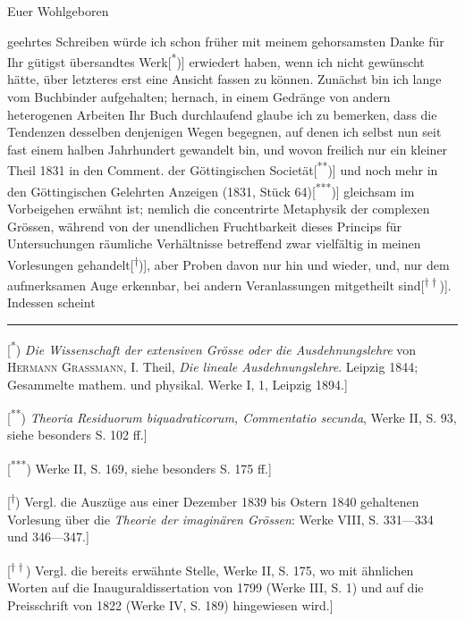 \par\medskip\noindent\hspace*{.26\linewidth}Euer Wohlgeboren
\par\indent geehrtes Schreiben würde ich schon früher mit meinem gehorsamsten Danke für Ihr gütigst übersandtes Werk[\textsuperscript{*})] erwiedert haben, wenn ich nicht gewünscht hätte, über letzteres erst eine Ansicht fassen zu können. Zunächst bin ich lange vom Buchbinder aufgehalten; hernach, in einem Gedränge von andern heterogenen Arbeiten Ihr Buch durchlaufend glaube ich zu bemerken, dass die Tendenzen desselben  denjenigen Wegen begegnen, auf denen ich selbst nun seit fast einem halben Jahrhundert gewandelt bin, und wovon freilich nur ein kleiner Theil 1831 in den Comment. der Göttingischen Societät[\textsuperscript{**})] und noch mehr in den Göttingischen Gelehrten Anzeigen (1831, Stück 64)[\textsuperscript{***})] gleichsam im Vorbeigehen erwähnt ist; nemlich die concentrirte Metaphysik der complexen Grössen, während von der unendlichen Fruchtbarkeit dieses Princips für Untersuchungen räumliche Verhältnisse betreffend zwar vielfältig in meinen Vorlesungen gehandelt[\textsuperscript{\ensuremath{\dagger}})], aber Proben davon nur hin und wieder, und,  nur dem aufmerksamen Auge erkennbar, bei andern Veranlassungen mitgetheilt sind[\textsuperscript{\ensuremath{\dagger\dagger}})]. Indessen scheint
\par\medskip\noindent\rule{.24\linewidth}{.4pt}\par\smallskip
{\small
\noindent\hspace*{\parindent}[\textsuperscript{*}) \textit{Die Wissenschaft der extensiven Grösse oder die Ausdehnungslehre} von \textsc{Hermann Grassmann}, I. Theil, \textit{Die lineale Ausdehnungslehre}. Leipzig 1844; Gesammelte mathem. und physikal. Werke I, 1, Leipzig 1894.]
\par\noindent\hspace*{\parindent}[\textsuperscript{**}) \textit{Theoria Residuorum biquadraticorum, Commentatio secunda}, Werke II, S. 93, siehe besonders S. 102 ff.]
\par\noindent\hspace*{\parindent}[\textsuperscript{***}) Werke II, S. 169, siehe besonders S. 175 ff.]
\par\noindent\hspace*{\parindent}[\textsuperscript{\ensuremath{\dagger}}) Vergl. die Auszüge aus einer Dezember 1839 bis Ostern 1840 gehaltenen Vorlesung über die \textit{Theorie der imaginären Grössen}: Werke VIII, S. 331—334 und 346—347.]
\par\noindent\hspace*{\parindent}[\textsuperscript{\ensuremath{\dagger\dagger}}) Vergl. die bereits erwähnte Stelle, Werke II, S. 175, wo mit ähnlichen Worten auf die Inauguraldissertation von 1799 (Werke III, S. 1) und auf die Preisschrift von 1822 (Werke IV, S. 189) hingewiesen wird.]
\par}
